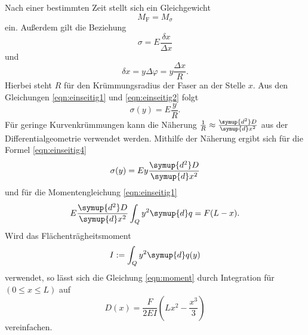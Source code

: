 Nach einer bestimmten Zeit stellt sich ein Gleichgewicht
\begin{equation}
    M_\text{F} = M_\sigma
    \label{eqn:einseitig1}
\end{equation}
ein.
Außerdem gilt die Beziehung
\begin{equation}
    \sigma = E \frac{\delta x}{\Delta x}
    \label{eqn:einseitig2}
\end{equation}
und
\begin{equation}
    \delta x = y \Delta \varphi = y \frac{\Delta x}{R} .
    \label{eqn:einseitig3}
\end{equation}
Hierbei steht $R$ für den Krümmungsradius der Faser an der Stelle $x$.
Aus den Gleichungen \eqref{eqn:einseitig1} und \eqref{eqn:einseitig2} folgt
\begin{equation}
    \sigma(y) = E \frac{y}{R} .
    \label{eqn:einseitig4}
\end{equation}
Für geringe Kurvenkrümmungen kann die Näherung $\frac{1}{R} \approx \frac{\symup{d^2}D}{\symup{d}x^2}$ aus der Differentialgeometrie verwendet werden.
Mithilfe der Näherung ergibt sich für die Formel \eqref{eqn:einseitig4}
\begin{equation}
\sigma(y) = E y \frac{\symup{d^2}D}{\symup{d}x^2}
\end{equation}
und für die Momentengleichung \eqref{eqn:einseitig1}
\begin{equation}
    E \frac{\symup{d^2}D}{\symup{d}x^2} \int_Q y^2 \symup{d}q = F(L-x).
    \label{eqn:moment}
\end{equation}
Wird das Flächenträgheitsmoment
\begin{equation*}
    I := \int_Q y^2 \symup{d}q(y)
\end{equation*}
verwendet, so lässt sich die Gleichung \eqref{eqn:moment} durch Integration für $(0 \leq x \leq L)$ auf
\begin{equation}
    D(x) = \frac{F}{2EI} \left( Lx^2-\frac{x^3}{3} \right)
    \label{eqn:d_einseitig}
\end{equation}
vereinfachen.
